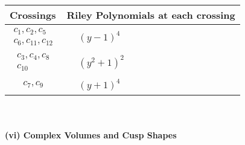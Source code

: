 \documentclass[1p]{elsarticle_modified}
\theoremstyle{definition}
\begin{document}
\begin{tabular}{m{50pt}|m{274pt}}
Crossings & \hspace{64pt}Riley Polynomials at each crossing \\
\hline $$\begin{aligned}c_{1},c_{2},c_{5}\\c_{6},c_{11},c_{12}\end{aligned}$$&$\begin{aligned}
&(y-1)^4
\end{aligned}$\\
\hline $$\begin{aligned}c_{3},c_{4},c_{8}\\c_{10}\end{aligned}$$&$\begin{aligned}
&(y^2+1)^2
\end{aligned}$\\
\hline $$\begin{aligned}c_{7},c_{9}\end{aligned}$$&$\begin{aligned}
&(y+1)^4
\end{aligned}$\\
\hline
\end{tabular}\\~\\
\newpage\flushleft \textbf{(vi) Complex Volumes and Cusp Shapes}
\end{document}
